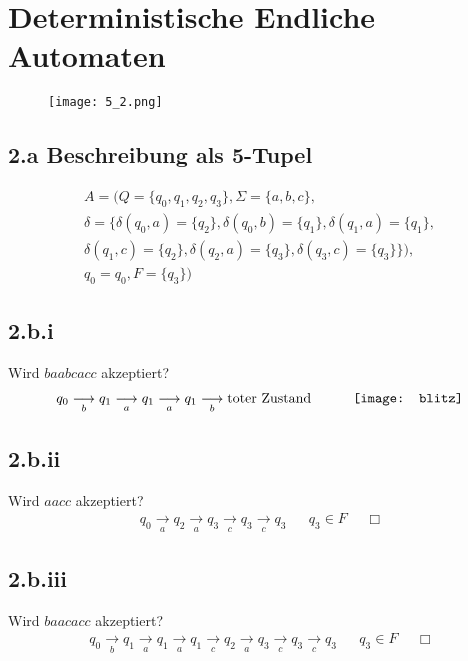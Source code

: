 \documentclass[10pt,ngerman]{scrartcl}
\begin{document}
\section{Deterministische Endliche Automaten}
\begin{figure}[h]
 \begin{center}
  \texttt{[image: 5\_2.png]}
 \end{center}
\end{figure}
\subsection{2.a Beschreibung als 5-Tupel}
\begin{align*}
 A = (Q=\{q_0,q_1,q_2,q_3\}, \Sigma=\{a,b,c\},\\
 \delta=\{\delta(q_0,a) = \{q_2\},\delta(q_0,b) = \{q_1\},\delta(q_1,a) = \{q_1\},\\
 \delta(q_1,c) = \{q_2\},\delta(q_2,a) = \{q_3\},\delta(q_3,c) = \{q_3\}\}),\\
 q_0 = q_0,F = \{q_3\})
\end{align*}
\subsection{2.b.i}
Wird $baabcacc$ akzeptiert?
\begin{align*}
q_0 \underset{b}{\longrightarrow} q_1 \underset{a}{\longrightarrow} q_1 \underset{a}{\longrightarrow} q_1 \underset{b}{\longrightarrow} \text{toter Zustand} && \qquad \vcenter{\hbox{\texttt{[image: blitz]}}}
\end{align*}
\subsection{2.b.ii}
Wird $aacc$ akzeptiert?
\begin{align*}
 q_0 \underset{a}{\longrightarrow} q_2 \underset{a}{\longrightarrow} q_3 \underset{c}{\longrightarrow} q_3 \underset{c}{\longrightarrow} q_3 && q_3 \in F && \Box
\end{align*}
\subsection{2.b.iii}
Wird $baacacc$ akzeptiert?
\begin{align*}
 q_0 \underset{b}{\longrightarrow} q_1 \underset{a}{\longrightarrow} q_1 \underset{a}{\longrightarrow} q_1 \underset{c}{\longrightarrow} q_2 \underset{a}{\longrightarrow} q_3 \underset{c}{\longrightarrow} q_3 \underset{c}{\longrightarrow} q_3 && q_3 \in F && \Box
\end{align*}
\end{document}
